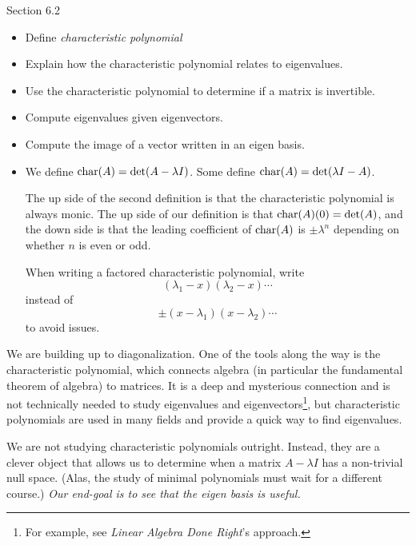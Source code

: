 \begin{lesson}

	Section 6.2

	\begin{itemize}
		\item Define \emph{characteristic polynomial}
		\item Explain how the characteristic polynomial relates to eigenvalues.
		\item Use the characteristic polynomial to determine if a matrix is invertible.
		\item Compute eigenvalues given eigenvectors.
		\item Compute the image of a vector written in an eigen basis.
	\end{itemize}

	\begin{annotation}
		\begin{notes}
			\begin{itemize}
				\item We define $\operatorname{char}(A)=\det(A-\lambda I)$.
					Some define $\operatorname{char}(A)=\det(\lambda I-A)$.

					The up side of the second definition is
					that the characteristic polynomial is always monic.
					The up side of our definition is that
					$\operatorname{char}(A)(0)=\det(A)$, and the down side is that
					the leading coefficient of $\operatorname{char}(A)$ is $\pm\lambda^n$ depending
					on whether $n$ is even or odd.

					When writing a factored characteristic polynomial, write
					\[
						(\lambda_1-x)(\lambda_2-x)\cdots
					\]
					instead of
					\[
						\pm(x-\lambda_1)(x-\lambda_2)\cdots
					\]
					to avoid issues.
			\end{itemize}
		\end{notes}
	\end{annotation}
	We are building up to diagonalization. One of the tools along the way is the characteristic polynomial,
	which connects algebra (in particular the fundamental theorem of algebra) to matrices. It is a deep
	and mysterious connection and is not technically needed to study eigenvalues and eigenvectors\footnote{
		For example, see \emph{Linear Algebra Done Right}'s approach.}, but characteristic polynomials
	are used in many fields and provide a quick way to find eigenvalues.

	We are not studying characteristic polynomials outright. Instead, they are a clever object
	that allows us to determine when a matrix $A-\lambda I$ has a non-trivial null space. (Alas, the
	study of minimal polynomials must wait for a different course.)
	\emph{Our end-goal is to see that the eigen basis is useful.}

\end{lesson}
